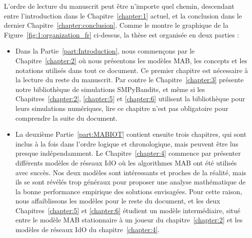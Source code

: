 \begin{resume_fr}
L'ordre de lecture du manuscrit peut être n'importe quel chemin, descendant entre l'introduction dans le Chapitre~\ref{chapter:1} actuel, et la conclusion dans le dernier Chapitre~\ref{chapter:conclusion}.
Comme le montre le graphique de la Figure~\ref{fig:1:organization_fr} ci-dessus,
la thèse est organisée en deux parties :

\begin{itemize}
    \item
Dans la Partie~\ref{part:Introduction}, nous commençons par le Chapitre~\ref{chapter:2} où nous présentons les modèles MAB, les concepts et les notations utilisés dans tout ce document. Ce premier chapitre est nécessaire à la lecture du reste du manuscrit.
Par contre le Chapitre~\ref{chapter:3} présente notre bibliothèque de simulations SMPyBandits, et même si les Chapitres~\ref{chapter:2}, \ref{chapter:5} et \ref{chapter:6} utilisent la bibliothèque pour leurs simulations numériques, lire ce chapitre n'est pas obligatoire pour comprendre la suite du document.

    \item
La deuxième Partie~\ref{part:MABIOT} contient ensuite trois chapitres, qui sont inclus à la fois dans l'ordre logique et chronologique, mais peuvent être lus presque indépendamment.
Le Chapitre~\ref{chapter:4} commence par présenter différents modèles de réseaux IdO où les algorithmes MAB ont été utilisés avec succès. Nos deux modèles sont intéressants et proches de la réalité, mais ils se sont révélés trop généraux pour proposer une analyse mathématique de la bonne performance empirique des solutions envisagées.
Pour cette raison, nous affaiblissons les modèles pour le reste du document,
et les deux Chapitres~\ref{chapter:5} et \ref{chapter:6} étudient un modèle intermédiaire, situé entre le modèle MAB stationnaire à un joueur du chapitre~\ref{chapter:2} et les modèles de réseaux IdO du chapitre~\ref{chapter:4}.
\end{itemize}

\end{resume_fr}
